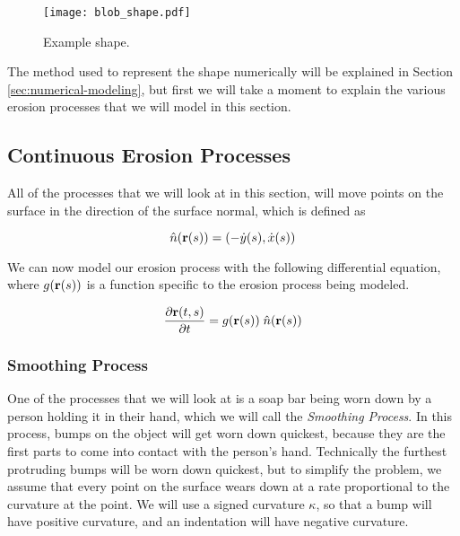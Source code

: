 \begin{figure}[H]
  \begin{center}
    \texttt{[image: blob\_shape.pdf]}
  \end{center}
  \vspace{-.2in} %
  \caption{\label{fig:blob-shape} Example shape.}
\end{figure}

The method used to represent the shape numerically will be explained in Section \ref{sec:numerical-modeling}, but first we will take a moment to explain the various erosion processes that we will model in this section.

\subsection*{Continuous Erosion Processes}

All of the processes that we will look at in this section, will move points on the surface in the direction of the surface normal, which is defined as

\[
  \hat{n}(\mathbf{r}(s)) = (-\dot{y}(s), \dot{x}(s))
\]

We can now model our erosion process with the following differential equation, where $g(\mathbf{r}(s))$ is a function specific to the erosion process being modeled.

\begin{equation}
  \label{eq:erosion-diff-eq}
  \frac{\partial \mathbf{r}(t, s)}{\partial t} = g(\mathbf{r}(s)) \; \hat{n}(\mathbf{r}(s))
\end{equation}

\subsubsection*{Smoothing Process}

One of the processes that we will look at is a soap bar being worn down by a person holding it in their hand, which we will call the \textit{Smoothing Process}. In this process, bumps on the object will get worn down quickest, because they are the first parts to come into contact with the person's hand. Technically the furthest protruding bumps will be worn down quickest, but to simplify the problem, we assume that every point on the surface wears down at a rate proportional to the curvature at the point. We will use a signed curvature $\kappa$, so that a bump will have positive curvature, and an indentation will have negative curvature. 

